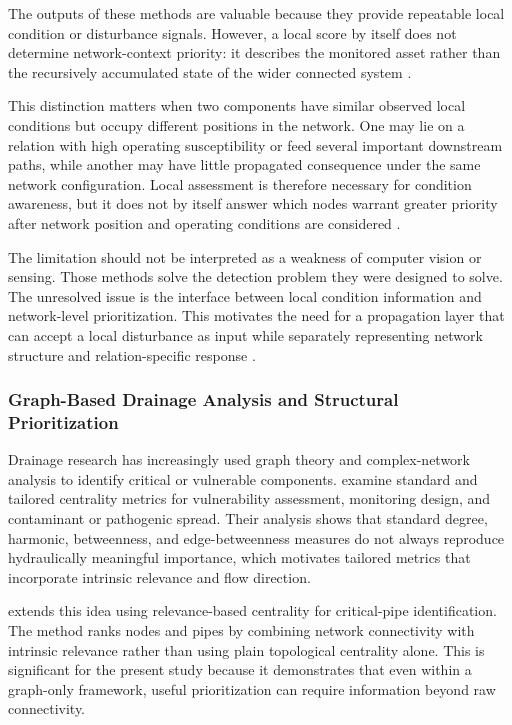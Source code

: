 The outputs of these methods are valuable because they provide repeatable
local condition or disturbance signals. However, a local score by itself
does not determine network-context priority: it describes the monitored
asset rather than the recursively accumulated state of the wider connected
system \citep{iqbal2021,vandaele2024,simone2022}.

This distinction matters when two components have similar observed local
conditions but occupy different positions in the network. One may lie on
a relation with high operating susceptibility or feed several important
downstream paths, while another may have little propagated consequence
under the same network configuration. Local assessment is therefore
necessary for condition awareness, but it does not by itself answer which
nodes warrant greater priority after network position and operating
conditions are considered \citep{simone2022,dastgir2023,zhang2025}.

The limitation should not be interpreted as a weakness of computer
vision or sensing. Those methods solve the detection problem they were
designed to solve. The unresolved issue is the interface between local
condition information and network-level prioritization. This motivates
the need for a propagation layer that can accept a local disturbance as
input while separately representing network structure and
relation-specific response \citep{simone2022,dastgir2023,meijer2023}.

\subsubsection{Graph-Based Drainage Analysis and Structural
Prioritization}\label{graph-based-drainage-analysis-and-structural-prioritization}

Drainage research has increasingly used graph theory and complex-network
analysis to identify critical or vulnerable components. \citet{simone2022} examine standard and tailored centrality metrics for
vulnerability assessment, monitoring design, and contaminant or
pathogenic spread. Their analysis shows that standard degree, harmonic,
betweenness, and edge-betweenness measures do not always reproduce
hydraulically meaningful importance, which motivates tailored metrics
that incorporate intrinsic relevance and flow direction.

\citet{simone2023} extends this idea using relevance-based centrality for
critical-pipe identification. The method ranks nodes and pipes by
combining network connectivity with intrinsic relevance rather than
using plain topological centrality alone. This is significant for the
present study because it demonstrates that even within a graph-only
framework, useful prioritization can require information beyond raw
connectivity.

